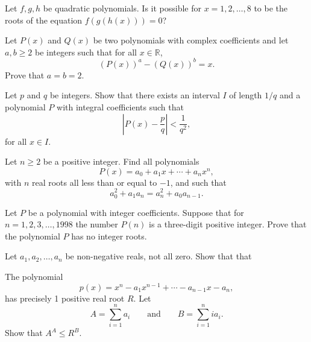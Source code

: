 \begin{question}[name={1995 Russia}]
    Let $f,g,h$ be quadratic polynomials. Is it possible for $x=1,2,\dots,8$ to be the roots of the equation $f(g(h(x)))=0$?
\end{question}

\begin{question}[name={1998 Iran}]
    Let $P(x)$ and $Q(x)$ be two polynomials with complex coefficients and let $a,b\geq 2$ be integers such that for all $x\in\mathbb R$,
    \[\left(P(x)\right)^a-\left(Q(x)\right)^b = x.\]
    Prove that $a=b=2$.
\end{question}

\begin{question}[name={1983 IMO Longlist}]
    Let $p$ and $q$ be integers. Show that there exists an interval $I$ of length $1/q$ and a polynomial $P$ with integral coefficients such that
    \[ \left|P(x)-\frac pq \right| < \frac{1}{q^2},\] for all $x \in I.$
\end{question}

\begin{question}[name={1998 Poland}]
    Let $n\geq 2$ be a positive integer. Find all polynomials \[P(x)=a_0+a_1x+\cdots+a_nx^n,\] with $n$ real roots all less than or equal to $-1$, and such that
    \[a_0^2+a_1a_n=a_n^2+a_{0}a_{n-1}.\]
\end{question}

\begin{question}[name={1998 Baltic Way}]
    Let $P$ be a polynomial with integer coefficients. Suppose that for $n=1,2,3,\ldots ,1998$ the number $P(n)$ is a three-digit positive integer. Prove that the polynomial $P$ has no integer roots.	
\end{question}


\begin{question}[name={1996 IMO Shortlist}]
    Let $a_{1}, a_{2},\dots, a_{n}$ be non-negative reals, not all zero. Show that that
    \begin{tasks}
        \task The polynomial \[p(x) = x^{n} - a_{1}x^{n - 1} + \cdots - a_{n - 1}x - a_{n},\] has precisely 1 positive real root $R$.
        \task Let \[A = \sum_{i = 1}^n a_{i} \qquad \text{and} \qquad B = \sum_{i = 1}^n ia_{i}.\] Show that $A^{A} \leq R^{B}$.
    \end{tasks}
\end{question}


